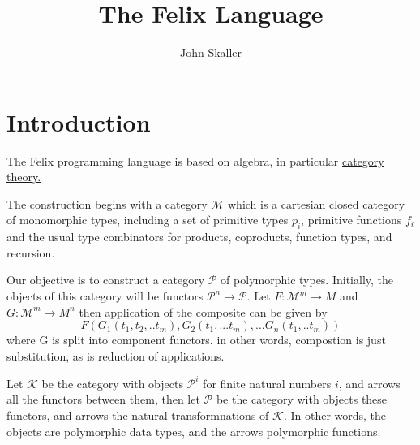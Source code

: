 \documentclass[oneside]{book}
\title{The Felix Language}
\author{John Skaller}
\begin{document}
\maketitle
\tableofcontents
\chapter{Introduction}
The Felix programming language is based on algebra, in particular
\href{ https://en.wikipedia.org/wiki/Category_theory}{category theory.}

The construction begins with a category \(\mathcal{M}\) which is a cartesian closed category
of monomorphic types, including a set of primitive types \(p_i\), primitive functions \(f_i\)
and the usual type combinators for products, coproducts, function types, and recursion.

Our objective is to construct a category \(\mathcal{P}\) of polymorphic types. Initially,
the objects of this category will be functors  \(\mathcal{P}^n\rightarrow \mathcal{P}\).
Let \(F: \mathcal{M}^m \rightarrow M\) and \(G: \mathcal{M}^m \rightarrow M^n\) then application
of the composite can be given by 
$$F (G_1 (t_1, t_2, .. t_m),  G_2 (t_1, ... t_m) , ... G_n (t_1, .. t_m))$$
where G is split into component functors. in other words, compostion is just substitution, as is 
reduction of applications.

Let \(\mathcal{K}\) be the category with objects \(\mathcal{P}^i\) for finite natural
numbers $i$, and arrows all the functors between them, then let \(\mathcal{P}\) 
be the category with objects these functors, and arrows the natural transformnations
of \(\mathcal{K}\). In other words, the objects are polymorphic data types,
and the arrows polymorphic functions.



\clearpage
\printglossaries
\clearpage
{}
\printindex
\backmatter
\end{document}
